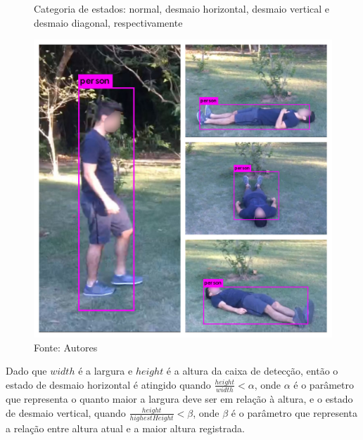 \documentclass[]{politex}
\begin{document}
\begin{figure}[H]
    \centering
    \caption{Categoria de estados: normal, desmaio horizontal, desmaio vertical e desmaio diagonal, respectivamente}
    \includegraphics[width=\textwidth]{ClassesDesmaio.jpg}
    \caption*{Fonte: Autores}
    \label{fig:classes_desmaio}
\end{figure}

Dado que \(width\) é a largura e \(height\) é a altura da caixa de detecção, então o estado de desmaio horizontal é atingido quando \(\frac{height}{width}<\alpha\), onde \(\alpha\) é o parâmetro que representa o quanto maior a largura deve ser em relação à altura, e o estado de desmaio vertical, quando \(\frac{height}{highestHeight} < \beta\), onde \(\beta\) é o parâmetro que representa a relação entre altura atual e a maior altura registrada.
\end{document}

